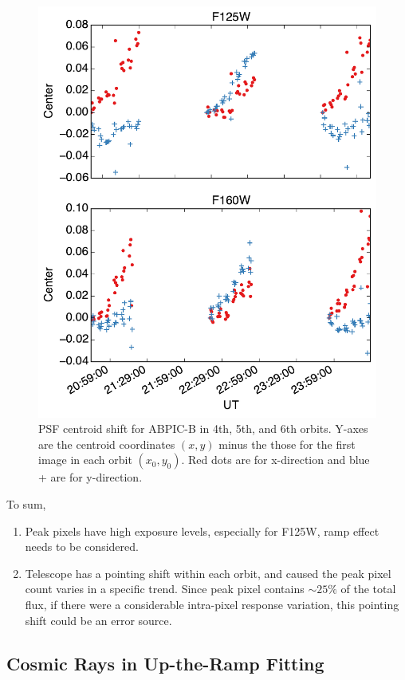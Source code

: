 \documentclass[paper=letter, fontsize=11pt]{scrartcl} %
\numberwithin{equation}{section} %
\numberwithin{figure}{section} %
\numberwithin{table}{section} %
\begin{document}
  \begin{figure}[th]
    \centering
    \includegraphics[width=1.0\textwidth]{Ymove}
    \caption{PSF centroid shift for ABPIC-B in 4th, 5th, and 6th
      orbits. Y-axes are the centroid coordinates $(x, y)$ minus the
      those for the first image in each orbit $(x_0, y_0)$. Red dots
      are for x-direction and blue + are for y-direction.}
    \label{fig:center}
  \end{figure}

  To sum,
  \begin{enumerate}
  \item Peak pixels have high exposure levels, especially for F125W,
    ramp effect needs to be considered.
  \item Telescope has a pointing shift within each orbit, and caused
    the peak pixel count varies in a specific trend. Since peak pixel
    contains $\sim 25\%$ of the total flux, if there were a
    considerable intra-pixel response variation, this pointing shift
    could be an error source.
  \end{enumerate}



\subsection{Cosmic Rays in Up-the-Ramp Fitting}
\end{document}

